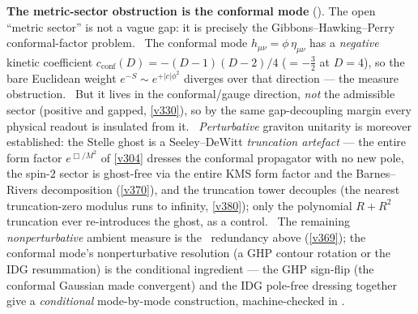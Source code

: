 \documentclass[11pt,a4paper]{article}
\begin{document}
\par\smallskip\noindent\textbf{The metric-sector obstruction is the conformal mode}
(). The open ``metric sector'' is not a vague gap: it is precisely the
Gibbons--Hawking--Perry conformal-factor problem. \mE\ The conformal mode $h_{\mu\nu}{=}\phi\,\eta_{\mu\nu}$ has a
\emph{negative} kinetic coefficient $c_{\mathrm{conf}}(D){=}-(D{-}1)(D{-}2)/4$ (${=}-\tfrac32$ at $D{=}4$), so the
bare Euclidean weight $e^{-S}\sim e^{+|c|\phi^2}$ diverges over that direction --- the measure obstruction. \mE\
But it lives in the conformal/gauge direction, \emph{not} the admissible sector (positive and gapped, \vref{v330}),
so by the same gap-decoupling margin every physical readout is insulated from it. \mC\ \emph{Perturbative} graviton
unitarity is moreover established: the Stelle ghost is a Seeley--DeWitt \emph{truncation artefact} --- the entire
form factor $e^{\Box/M^2}$ of \vref{v304} dresses the conformal propagator with no new pole, the spin-$2$ sector is
ghost-free via the entire KMS form factor and the Barnes--Rivers decomposition (\vref{v370}), and the truncation
tower decouples (the nearest truncation-zero modulus runs to infinity, \vref{v380}); only the polynomial
$R{+}R^2$ truncation ever re-introduces the ghost, as a control. \mC\ The remaining \emph{nonperturbative} ambient
measure is the \mC\ redundancy above (\vref{v369}); the conformal mode's nonperturbative resolution (a GHP contour
rotation or the IDG resummation) is the conditional ingredient --- the GHP sign-flip (the conformal Gaussian made
convergent) and the IDG pole-free dressing together give a \emph{conditional} mode-by-mode construction,
machine-checked in \veri{v334\_conformal\_resolution.py}.

\end{document}
